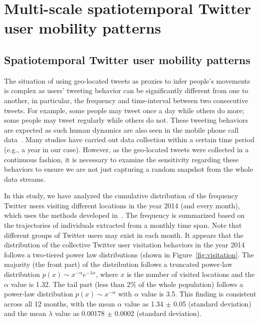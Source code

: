 \documentclass[ijgi,article,accept,moreauthors,pdftex,10pt,a4paper]{mdpi}
\theoremstyle{mdpi}
\newcounter{ex}
\newcounter{re}
\theoremstyle{mdpidefinition}
\begin{document}
\section{Multi-scale spatiotemporal Twitter user mobility patterns}
\subsection{Spatiotemporal Twitter user mobility patterns}
The situation of using geo-located tweets as proxies to infer people's movements is complex as users' tweeting behavior can be significantly different from one to another, in particular, the frequency and time-interval between two consecutive tweets.
For example, some people may tweet once a day while others do more; some people may tweet regularly while others do not.  
These tweeting behaviors are expected as such human dynamics are also seen in the mobile phone call data~\cite{gonzalez2008understanding}. 
Many studies have carried out data collection within a certain time period (e.g., a year in our case).
However, as the geo-located tweets were collected in a continuous fashion, it is necessary to examine the sensitivity regarding these behaviors to ensure we are not just capturing a random snapshot from the whole data streams. 

In this study, we have analyzed the cumulative distribution of the frequency Twitter users visiting different locations in the year 2014 (and every month), which uses the methods developed in~\cite{clauset2009power}. 
The frequency is summarized based on the trajectories of individuals extracted from a monthly time span.
Note that different groups of Twitter users may exist in each month. 
It appears that the distribution of the collective Twitter user visitation behaviors in the year 2014 follows a two-tiered power law distributions (shown in Figure~\ref{fig:visitation}.
The majority (the front part) of the distribution follows a truncated power-law distribution $p(x)\sim x^{-\alpha}e^{-\lambda x}$, where $x$ is the number of visited locations and the $\alpha$ value is 1.32.
The tail part (less than 2$\%$ of the whole population) follows a power-law distribution  $p(x)\sim x^{-\alpha}$ with $\alpha$ value is 3.5.
This finding is consistent across all 12 months, with the mean $\alpha$ value as 1.34 $ \pm$  0.05 (standard deviation) and the mean $\lambda$ value as 0.00178 $ \pm$  0.0002 (standard deviation).
\end{document}
